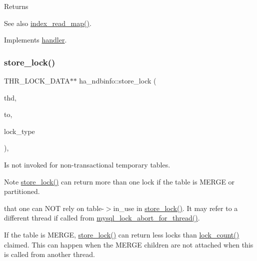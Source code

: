 \begin{DoxyReturn}{Returns}

\end{DoxyReturn}
\begin{DoxySeeAlso}{See also}
\mbox{\hyperlink{classhandler_af8c2b258691e5baac8dd22d19c084b37}{index\+\_\+read\+\_\+map()}}. 
\end{DoxySeeAlso}


Implements \mbox{\hyperlink{classhandler_adf659edd9d870e90c8974ae0eba7a082}{handler}}.

\mbox{\label{classha__ndbinfo_a7169a09db353528ca14a979b01e56eb6}} 
\subsubsection{\texorpdfstring{store\+\_\+lock()}{store\_lock()}}
{\footnotesize\ttfamily T\+H\+R\+\_\+\+L\+O\+C\+K\+\_\+\+D\+A\+TA$\ast$$\ast$ ha\+\_\+ndbinfo\+::store\+\_\+lock (\begin{DoxyParamCaption}\item[{T\+HD $\ast$}]{thd,  }\item[{T\+H\+R\+\_\+\+L\+O\+C\+K\+\_\+\+D\+A\+TA $\ast$$\ast$}]{to,  }\item[{enum thr\+\_\+lock\+\_\+type}]{lock\+\_\+type }\end{DoxyParamCaption})\hspace{0.3cm}{\ttfamily [inline]}, {\ttfamily [virtual]}}

Is not invoked for non-\/transactional temporary tables.

\begin{DoxyNote}{Note}
\mbox{\hyperlink{classha__ndbinfo_a7169a09db353528ca14a979b01e56eb6}{store\+\_\+lock()}} can return more than one lock if the table is M\+E\+R\+GE or partitioned.

that one can N\+OT rely on table-\/$>$in\+\_\+use in \mbox{\hyperlink{classha__ndbinfo_a7169a09db353528ca14a979b01e56eb6}{store\+\_\+lock()}}. It may refer to a different thread if called from \mbox{\hyperlink{group__Locking_gad2320fa808c9d6523790e796d57e2331}{mysql\+\_\+lock\+\_\+abort\+\_\+for\+\_\+thread()}}.

If the table is M\+E\+R\+GE, \mbox{\hyperlink{classha__ndbinfo_a7169a09db353528ca14a979b01e56eb6}{store\+\_\+lock()}} can return less locks than \mbox{\hyperlink{classhandler_a2447668275a831bcf73b5c00818254a6}{lock\+\_\+count()}} claimed. This can happen when the M\+E\+R\+GE children are not attached when this is called from another thread. 
\end{DoxyNote}


